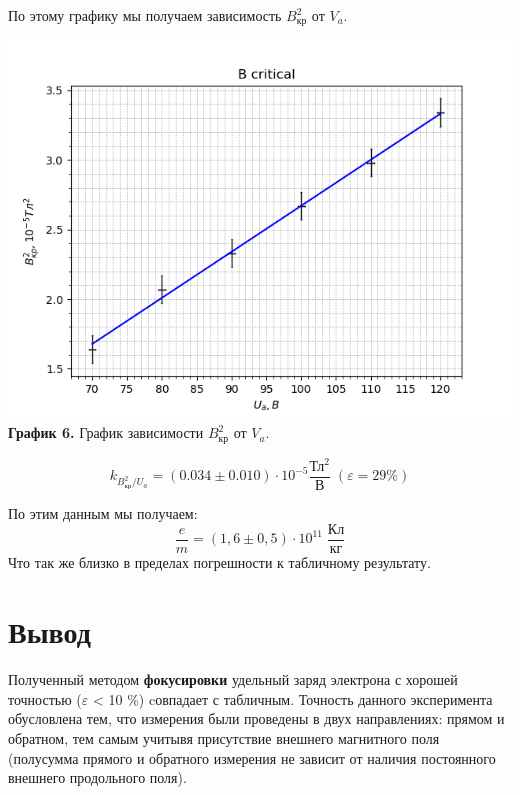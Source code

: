 \documentclass[a4paper, 12pt]{article}
\begin{document}
По этому графику мы получаем зависимость $B_{\text{кр}}^2$ от $V_a$.

\begin{center}
\includegraphics[width = \textwidth]{data/magnet/graphs/B_critical.png}\\
\textbf{График 6.} График зависимости $B_{\text{кр}}^2$ от $V_a$.
\end{center}

\begin{equation}
    k_{B_{\text{кр}}^2/U_a} = (0.034 \pm 0.010) \cdot 10^{-5} \frac{\text{Тл}^2}{\text{В}} \; (\varepsilon = 29 \%)
\end{equation}

По этим данным мы получаем:
\begin{equation}
    \dfrac{e}{m} = (1,6 \pm 0,5) \cdot 10^{11} \; \frac{\text{Кл}}{\text{кг}}
\end{equation}
Что так же близко в пределах погрешности к табличному результату.

\section*{Вывод}

\paragraph{}Полученный методом \textbf{фокусировки} удельный заряд электрона с хорошей точностью ($\varepsilon$ < 10 \%) cовпадает с табличным. Точность данного эксперимента обусловлена тем, что измерения были проведены в двух направлениях: прямом и обратном, тем самым учитывя присутствие внешнего магнитного поля (полусумма прямого и обратного измерения не зависит от наличия постоянного внешнего продольного поля).
\end{document}
